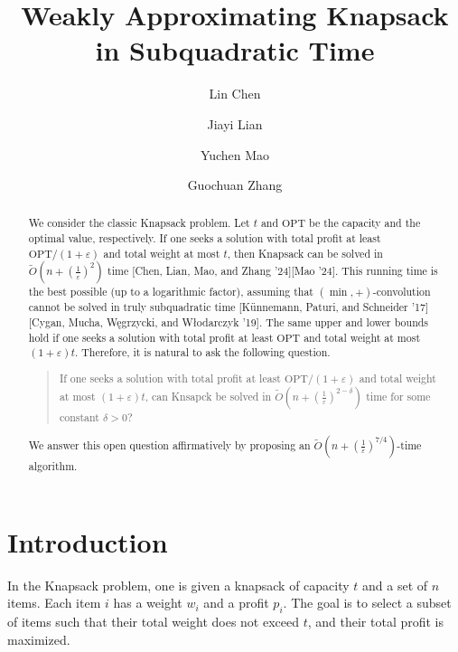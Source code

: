 \documentclass[a4paper,UKenglish,cleveref, autoref, thm-restate, pdfa]{lipics-v2021}
\title{Weakly Approximating Knapsack in Subquadratic Time}
\author{Lin Chen}{Zhejiang University, Hangzhou, China
\and \url{https://person.zju.edu.cn/en/linchen}}{chenlin198662@zju.edu.cn}{https://orcid.org/0000-0003-3909-4916}{}
\author{Jiayi Lian}{Zhejiang University, Hangzhou, China
\and \url{https://joeylian.github.io/}}{jiayilian@zju.edu.cn}{https://orcid.org/0009-0006-4408-9627}{}
\author{Yuchen Mao}{Zhejiang University, Hangzhou, China
\and \url{https://person.zju.edu.cn/en/maoyc}}{maoyc@zju.edu.cn}{https://orcid.org/0000-0002-1075-344X}{Supported by National Natural Science Foundation of China [Project No. 62402436].}
\author{Guochuan Zhang}{Zhejiang University, Hangzhou, China
\and \url{https://person.zju.edu.cn/en/0096209}}{zgc@zju.edu.cn}{https://orcid.org/0000-0003-1947-7872}{Supported by National Natural Science Foundation of China [Project No. 12271477].}
\newcommand{\eps}{\varepsilon}
\begin{document}
\maketitle

\begin{abstract}
We consider the classic Knapsack problem.  Let $t$ and $\mathrm{OPT}$ be the capacity and the optimal value, respectively. If one seeks a solution with total profit at least $\mathrm{OPT}/(1 + \eps)$ and total weight at most $t$, then Knapsack can be solved in $\tilde{O}(n + (\frac{1}{\eps})^2)$ time [Chen, Lian, Mao, and Zhang '24][Mao '24]. This running time is the best possible (up to a logarithmic factor), assuming that $(\min,+)$-convolution cannot be solved in truly subquadratic time [Künnemann, Paturi, and Schneider '17][Cygan, Mucha, Węgrzycki, and Włodarczyk '19]. The same upper and lower bounds hold if one seeks a solution with total profit at least $\mathrm{OPT}$ and total weight at most $(1 + \eps)t$. Therefore, it is natural to ask the following question. 
    \begin{quote}
        If one seeks a solution with total profit at least $\mathrm{OPT}/(1+\eps)$ and total weight at most $(1 + \eps)t$, can Knsapck be solved in $\tilde{O}(n + (\frac{1}{\eps})^{2-\delta})$ time for some constant $\delta > 0$?
    \end{quote}
    We answer this open question affirmatively by proposing an $\tilde{O}(n + (\frac{1}{\eps})^{7/4})$-time algorithm.
\end{abstract}

\section{Introduction}
In the Knapsack problem, one is given a knapsack of capacity $t$ and a set of $n$ items. Each item $i$ has a weight $w_i$ and a profit $p_i$. The goal is to select a subset of items such that their total weight does not exceed $t$, and their total profit is maximized. 
\end{document}
